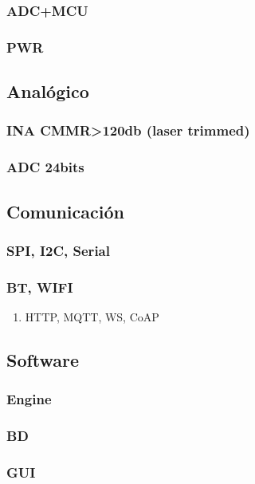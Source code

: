 \subsubsection{ADC+MCU}
\label{sec:orgcf00686}
\subsubsection{PWR}
\label{sec:orgc4aeb97}

\subsection{Analógico}
\label{sec:orga3646ba}
\subsubsection{INA CMMR>120db (laser trimmed)}
\label{sec:org378ba0e}
\subsubsection{ADC 24bits}
\label{sec:orgf5daa5e}
\subsection{Comunicación}
\label{sec:orgdefc4de}
\subsubsection{SPI, I2C, Serial}
\label{sec:org34879a6}
\subsubsection{BT, WIFI}
\label{sec:org3e671ed}
\begin{enumerate}
\item HTTP, MQTT, WS, CoAP
\label{sec:orga085a75}
\end{enumerate}
\subsection{Software}
\label{sec:org97fb765}
\subsubsection{Engine}
\label{sec:org8943f39}
\subsubsection{BD}
\label{sec:orgcf44456}
\subsubsection{GUI}
\label{sec:orga85c54c}
